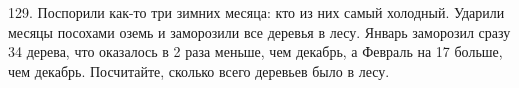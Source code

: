 129. Поспорили как-то три зимних месяца: кто из них самый холодный. Ударили месяцы посохами оземь и заморозили все деревья в лесу. Январь заморозил сразу 34 дерева, что оказалось в 2 раза меньше, чем декабрь, а Февраль на 17 больше, чем декабрь. Посчитайте, сколько всего деревьев было в лесу.\\
